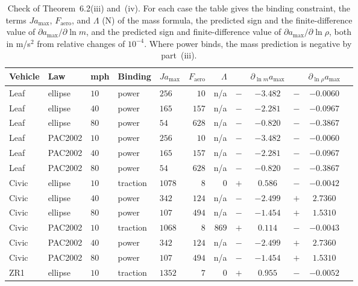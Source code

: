 \documentclass[12pt, twoside]{amsart}
\theoremstyle{definition}
\newcommand{\amax}{a_{\max}}
\newcommand{\mainref}[2]{#2}
\begin{document}
\begin{table}[htbp]
\centering\footnotesize
\setlength{\tabcolsep}{3.5pt}
\caption{Check of Theorem~\mainref{thm:signtable}{6.2}\mainref{sg:mass}{{(iii)}} and~\mainref{sg:rho}{{(iv)}}. For each case the table gives the binding constraint, the terms $J\amax$, $F_{\mathrm{aero}}$, and $\Lambda$ (N) of the mass formula, the predicted sign and the finite-difference value of $\partial\amax/\partial\ln m$, and the predicted sign and finite-difference value of $\partial\amax/\partial\ln\rho$, both in m/s$^2$ from relative changes of $10^{-4}$. Where power binds, the mass prediction is negative by part~\mainref{sg:mass}{{(iii)}}.}\label{tab:app-signs}
\begin{tabular}{lllllrrrcrcr}
\toprule
Vehicle & Law & mph & Binding & $J\amax$ & $F_{\mathrm{aero}}$ & $\Lambda$ & & $\partial_{\ln m}\amax$ & & $\partial_{\ln\rho}\amax$\\
\midrule
Leaf & ellipse & $10$ & power & $256$ & $10$ & n/a & $-$ & $-3.482$ & $-$ & $-0.0060$\\
Leaf & ellipse & $40$ & power & $165$ & $157$ & n/a & $-$ & $-2.281$ & $-$ & $-0.0967$\\
Leaf & ellipse & $80$ & power & $54$ & $628$ & n/a & $-$ & $-0.820$ & $-$ & $-0.3867$\\
Leaf & PAC2002 & $10$ & power & $256$ & $10$ & n/a & $-$ & $-3.482$ & $-$ & $-0.0060$\\
Leaf & PAC2002 & $40$ & power & $165$ & $157$ & n/a & $-$ & $-2.281$ & $-$ & $-0.0967$\\
Leaf & PAC2002 & $80$ & power & $54$ & $628$ & n/a & $-$ & $-0.820$ & $-$ & $-0.3867$\\
Civic & ellipse & $10$ & traction & $1078$ & $8$ & $0$ & $+$ & $0.586$ & $-$ & $-0.0042$\\
Civic & ellipse & $40$ & power & $342$ & $124$ & n/a & $-$ & $-2.499$ & $+$ & $2.7360$\\
Civic & ellipse & $80$ & power & $107$ & $494$ & n/a & $-$ & $-1.454$ & $+$ & $1.5310$\\
Civic & PAC2002 & $10$ & traction & $1068$ & $8$ & $869$ & $+$ & $0.114$ & $-$ & $-0.0043$\\
Civic & PAC2002 & $40$ & power & $342$ & $124$ & n/a & $-$ & $-2.499$ & $+$ & $2.7360$\\
Civic & PAC2002 & $80$ & power & $107$ & $494$ & n/a & $-$ & $-1.454$ & $+$ & $1.5310$\\
ZR1 & ellipse & $10$ & traction & $1352$ & $7$ & $0$ & $+$ & $0.955$ & $-$ & $-0.0052$\\

\end{tabular}
\end{table}
\end{document}
